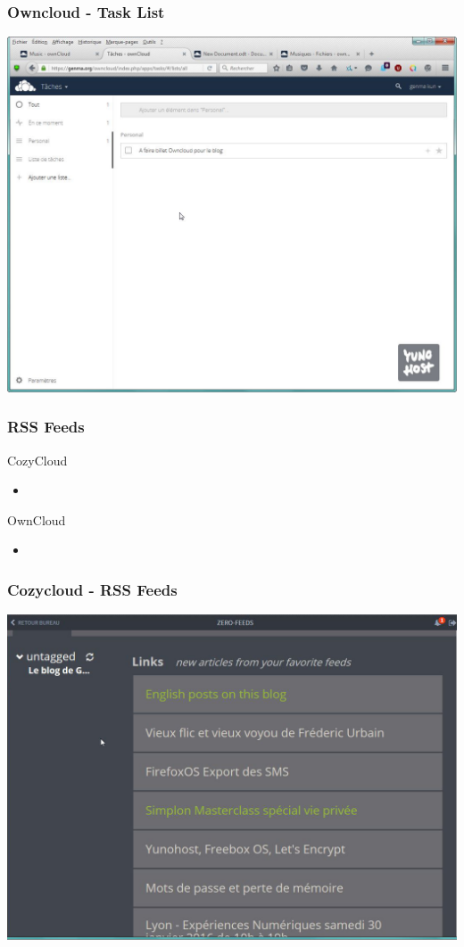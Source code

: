 \documentclass{beamer}
\begin{document}
\begin{frame}
\frametitle{Owncloud - Task List}
\includegraphics[scale=0.35] {./Owncloud/Owncloud_Taches.jpg}
\end{frame}

\begin{frame}
\frametitle{RSS Feeds}

\begin{block}{CozyCloud}
\begin{itemize}
\item 
\end{itemize}
\end{block}

\begin{block}{OwnCloud}
\begin{itemize}
\item 
\end{itemize}
\end{block}
\end{frame}


\begin{frame}
\frametitle{Cozycloud - RSS Feeds}
\includegraphics[scale=0.3] {./CozyCloud/CozyCloud_Zero-feeds.jpg}
\end{frame}
\end{document}
